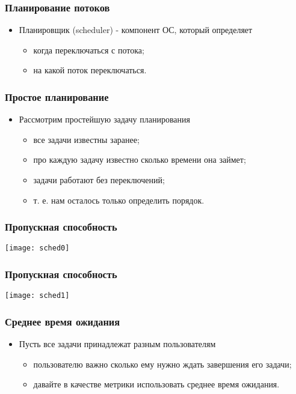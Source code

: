 \begin{frame}
\frametitle{Планирование потоков}
\begin{itemize}
    \item<1->Планировщик (scheduler) - компонент ОС, который определяет
    \begin{itemize}
        \item<2->когда переключаться с потока;
        \item<3->на какой поток переключаться.
    \end{itemize}
\end{itemize}
\end{frame}

\begin{frame}
\frametitle{Простое планирование}
\begin{itemize}
    \item<1->Рассмотрим простейшую задачу планирования
    \begin{itemize}
        \item<2->все задачи известны заранее;
        \item<3->про каждую задачу известно сколько времени она займет;
        \item<4->задачи работают без переключений;
        \item<5->т. е. нам осталось только определить порядок.
    \end{itemize}
\end{itemize}
\end{frame}

\begin{frame}
\frametitle{Пропускная способность}
\texttt{[image: sched0]}
\end{frame}

\begin{frame}
\frametitle{Пропускная способность}
\texttt{[image: sched1]}
\end{frame}

\begin{frame}
\frametitle{Среднее время ожидания}
\begin{itemize}
    \item<1->Пусть все задачи принадлежат разным пользователям
    \begin{itemize}
        \item<2->пользователю важно сколько ему нужно ждать
             завершения его задачи;
        \item<3->давайте в качестве метрики использовать среднее время ожидания.
    \end{itemize}
\end{itemize}
\end{frame}

